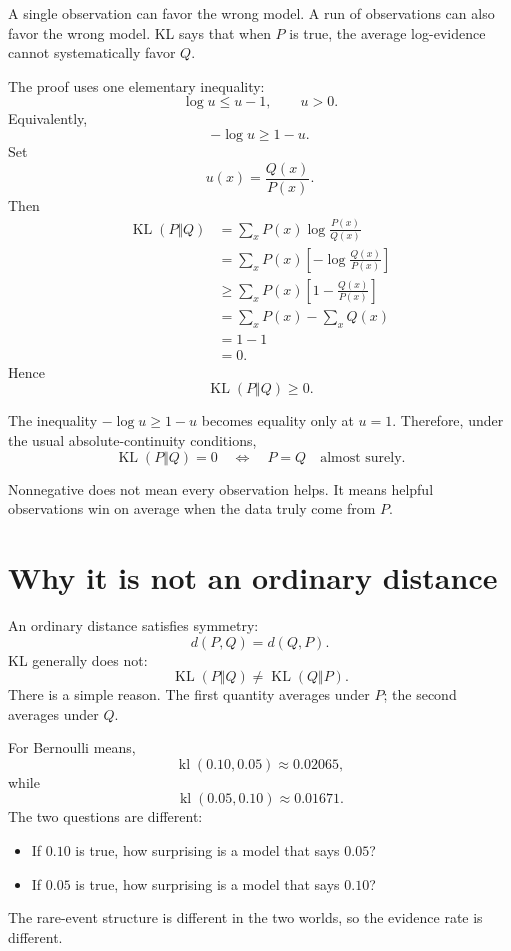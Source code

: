 \documentclass[en,nofont,11pt]{elegantbook}
\newcommand{\KL}{\operatorname{KL}}
\newcommand{\kl}{\operatorname{kl}}
\begin{document}
A single observation can favor the wrong model. A run of observations can also favor the wrong model. KL says that when $P$ is true, the average log-evidence cannot systematically favor $Q$.

The proof uses one elementary inequality:
\[
\log u\le u-1,
\qquad u>0.
\]
Equivalently,
\[
-\log u\ge 1-u.
\]
Set
\[
u(x)=\frac{Q(x)}{P(x)}.
\]
Then
\begin{align*}
\KL(P\Vert Q)
&=
\sum_xP(x)\log\frac{P(x)}{Q(x)}\\
&=
\sum_xP(x)\left[-\log\frac{Q(x)}{P(x)}\right]\\
&\ge
\sum_xP(x)\left[1-\frac{Q(x)}{P(x)}\right]\\
&=
\sum_xP(x)-\sum_xQ(x)\\
&=
1-1\\
&=
0.
\end{align*}
Hence
\[
\boxed{\KL(P\Vert Q)\ge0.}
\]

The inequality $-\log u\ge1-u$ becomes equality only at $u=1$. Therefore, under the usual absolute-continuity conditions,
\[
\KL(P\Vert Q)=0
\quad\Longleftrightarrow\quad
P=Q
\quad\text{almost surely.}
\]

\begin{thinkbox}
Nonnegative does not mean every observation helps. It means helpful observations win on average when the data truly come from $P$.
\end{thinkbox}

\section{Why it is not an ordinary distance}

An ordinary distance satisfies symmetry:
\[
d(P,Q)=d(Q,P).
\]
KL generally does not:
\[
\KL(P\Vert Q)\ne\KL(Q\Vert P).
\]
There is a simple reason. The first quantity averages under $P$; the second averages under $Q$.

For Bernoulli means,
\[
\kl(0.10,0.05)
\approx0.02065,
\]
while
\[
\kl(0.05,0.10)
\approx0.01671.
\]
The two questions are different:

\begin{itemize}
\item If $0.10$ is true, how surprising is a model that says $0.05$?
\item If $0.05$ is true, how surprising is a model that says $0.10$?
\end{itemize}

The rare-event structure is different in the two worlds, so the evidence rate is different.
\end{document}
